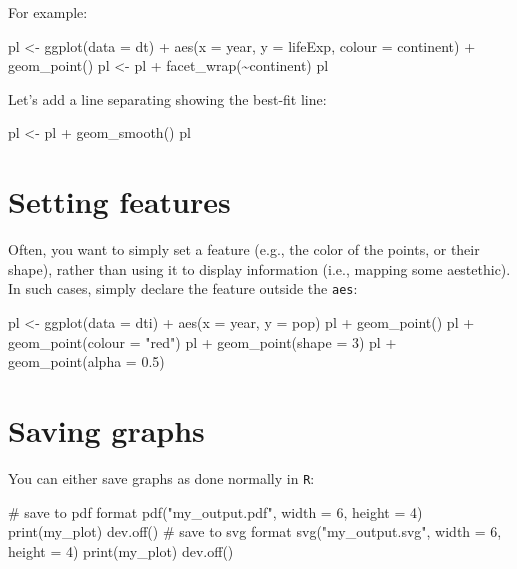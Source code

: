 \documentclass[
  letterpaper,
  DIV=11,
  numbers=noendperiod]{scrreprt}
\newenvironment{Shaded}{\begin{snugshade}}{\end{snugshade}}
\newcommand{\AttributeTok}[1]{\textcolor[rgb]{0.40,0.45,0.13}{#1}}
\newcommand{\CommentTok}[1]{\textcolor[rgb]{0.37,0.37,0.37}{#1}}
\newcommand{\DecValTok}[1]{\textcolor[rgb]{0.68,0.00,0.00}{#1}}
\newcommand{\FunctionTok}[1]{\textcolor[rgb]{0.28,0.35,0.67}{#1}}
\newcommand{\NormalTok}[1]{\textcolor[rgb]{0.00,0.23,0.31}{#1}}
\newcommand{\StringTok}[1]{\textcolor[rgb]{0.13,0.47,0.30}{#1}}
\begin{document}
For example:

\begin{Shaded}
\begin{Highlighting}[]
\NormalTok{pl \textless{}{-} ggplot(data = dt) + }
\NormalTok{  aes(x = year, y = lifeExp, colour = continent) + geom\_point()}
\NormalTok{pl \textless{}{-} pl + facet\_wrap(\textasciitilde{}continent)}
\NormalTok{pl}
\end{Highlighting}
\end{Shaded}

Let's add a line separating showing the best-fit line:

\begin{Shaded}
\begin{Highlighting}[]
\NormalTok{pl \textless{}{-} pl + geom\_smooth()}
\NormalTok{pl}
\end{Highlighting}
\end{Shaded}

\section{Setting features}\label{setting-features}

Often, you want to simply set a feature (e.g., the color of the points,
or their shape), rather than using it to display information (i.e.,
mapping some aestethic). In such cases, simply declare the feature
outside the \texttt{aes}:

\begin{Shaded}
\begin{Highlighting}[]
\NormalTok{pl \textless{}{-} ggplot(data = dti) + }
\NormalTok{  aes(x = year, y = pop)}
\NormalTok{pl + geom\_point()}
\NormalTok{pl + geom\_point(colour = "red")}
\NormalTok{pl + geom\_point(shape = 3)}
\NormalTok{pl + geom\_point(alpha = 0.5)}
\end{Highlighting}
\end{Shaded}

\section{Saving graphs}\label{saving-graphs}

You can either save graphs as done normally in \texttt{R}:

\begin{Shaded}
\begin{Highlighting}[]
\CommentTok{\# save to pdf format}
\FunctionTok{pdf}\NormalTok{(}\StringTok{"my\_output.pdf"}\NormalTok{, }\AttributeTok{width =} \DecValTok{6}\NormalTok{, }\AttributeTok{height =} \DecValTok{4}\NormalTok{)}
\FunctionTok{print}\NormalTok{(my\_plot)}
\FunctionTok{dev.off}\NormalTok{()}
\CommentTok{\# save to svg format}
\FunctionTok{svg}\NormalTok{(}\StringTok{"my\_output.svg"}\NormalTok{, }\AttributeTok{width =} \DecValTok{6}\NormalTok{, }\AttributeTok{height =} \DecValTok{4}\NormalTok{)}
\FunctionTok{print}\NormalTok{(my\_plot)}
\FunctionTok{dev.off}\NormalTok{()}
\end{Highlighting}
\end{Shaded}
\end{document}
